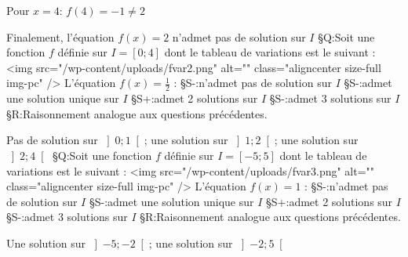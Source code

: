 \par
Pour $x=4$: $f\left(4\right)=-1\neq 2$
\par
Finalement, l'équation $f\left(x\right)=2$ n'admet pas de solution sur $I$
§Q:Soit une fonction $f$ définie sur $I=\left[0; 4\right]$ dont le tableau de variations est le suivant :
<img src="/wp-content/uploads/fvar2.png" alt="" class="aligncenter size-full  img-pc" />
L'équation $f\left(x\right)=\frac{1}{2}$ :
§S-:n'admet pas de solution sur $I$
§S-:admet une solution unique sur $I$
§S+:admet 2 solutions sur $I$
§S-:admet 3 solutions sur $I$
§R:Raisonnement analogue aux questions précédentes.
\par
Pas de solution sur $\left]0;1\right[$; une solution sur $\left]1;2\right[$; une solution sur $\left]2;4\right[$
§Q:Soit une fonction $f$ définie sur $I=\left[-5; 5\right]$ dont le tableau de variations est le suivant :
<img src="/wp-content/uploads/fvar3.png" alt="" class="aligncenter size-full  img-pc" />
L'équation $f\left(x\right)=1$ :
§S-:n'admet pas de solution sur $I$
§S-:admet une solution unique sur $I$
§S+:admet 2 solutions sur $I$
§S-:admet 3 solutions sur $I$
§R:Raisonnement analogue aux questions précédentes.
\par
Une solution sur $\left]-5;-2\right[$; une solution sur $\left]-2;5\right[$
\par
